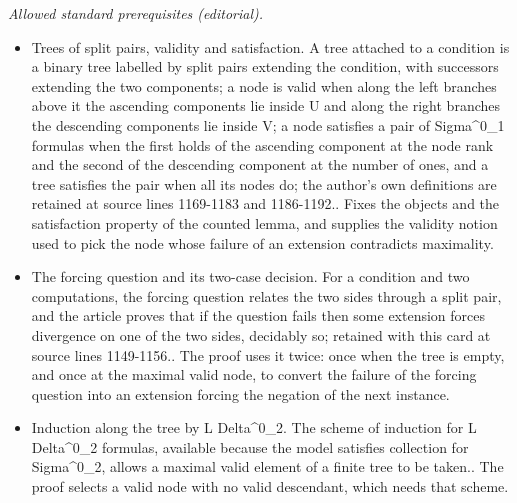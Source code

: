 \documentclass{article}
\numberwithin{theorem}{section}
\newtheorem{lemma}[theorem]{Lemma}
\newcommand{\qvdash}{\operatorname{{?}{\vdash}}}
\newcommand{\nqvdash}{\operatorname{{?}{\nvdash}}}
\begin{document}
\noindent\textit{Allowed standard prerequisites (editorial).}\begin{itemize}
\item Trees of split pairs, validity and satisfaction. A tree attached to a condition is a binary tree labelled by split pairs extending the condition, with successors extending the two components; a node is valid when along the left branches above it the ascending components lie inside U and along the right branches the descending components lie inside V; a node satisfies a pair of Sigma\textasciicircum{}0\_1 formulas when the first holds of the ascending component at the node rank and the second of the descending component at the number of ones, and a tree satisfies the pair when all its nodes do; the author's own definitions are retained at source lines 1169-1183 and 1186-1192.. Fixes the objects and the satisfaction property of the counted lemma, and supplies the validity notion used to pick the node whose failure of an extension contradicts maximality.
\item The forcing question and its two-case decision. For a condition and two computations, the forcing question relates the two sides through a split pair, and the article proves that if the question fails then some extension forces divergence on one of the two sides, decidably so; retained with this card at source lines 1149-1156.. The proof uses it twice: once when the tree is empty, and once at the maximal valid node, to convert the failure of the forcing question into an extension forcing the negation of the next instance.
\item Induction along the tree by L Delta\textasciicircum{}0\_2. The scheme of induction for L Delta\textasciicircum{}0\_2 formulas, available because the model satisfies collection for Sigma\textasciicircum{}0\_2, allows a maximal valid element of a finite tree to be taken.. The proof selects a valid node with no valid descendant, which needs that scheme.
\end{itemize}\medskip
{}
\end{document}
